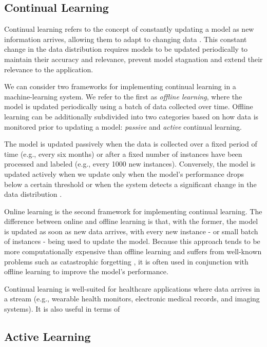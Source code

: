 \documentclass[../main.tex]{subfiles}
\begin{document}
    
	
	\subsection{Continual Learning} \label{sec:continual_learning}
	
	 Continual learning refers to the concept of constantly updating a model as new information arrives, allowing them to adapt to changing data \cite{huyen_designing_2022}. This constant change in the data distribution requires models to be updated periodically to maintain their accuracy and relevance, prevent model stagnation and extend their relevance to the application.

     We can consider two frameworks for implementing continual learning in a machine-learning system. We refer to the first as \textit{offline learning}, where the model is updated periodically using a batch of data collected over time. Offline learning can be additionally subdivided into two categories based on how data is monitored prior to updating a model: \textit{passive} and \textit{active} continual learning.

     The model is updated passively when the data is collected over a fixed period of time (e.g., every six months) or after a fixed number of instances have been processed and labeled (e.g., every 1000 new instances). Conversely, the model is updated actively when we update only when the model's performance drops below a certain threshold or when the system detects a significant change in the data distribution \cite{huyen_designing_2022}.

    Online learning is the second framework for implementing continual learning. The difference between online and offline learning is that, with the former, the model is updated as soon as new data arrives, with every new instance - or small batch of instances - being used to update the model. Because this approach tends to be more computationally expensive than offline learning and suffers from well-known problems such as catastrophic forgetting \cite{huyen_designing_2022}, it is often used in conjunction with offline learning to improve the model's performance. 

    Continual learning is well-suited for healthcare applications where data arrives in a stream (e.g., wearable health monitors, electronic medical records, and imaging systems). It is also useful in terms of 


    \subsection{Active Learning} \label{sec:active_learning}
 
\end{document}
